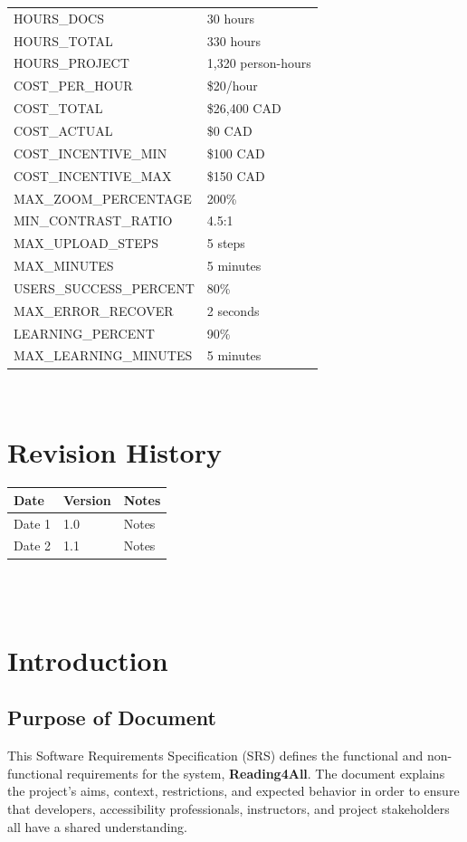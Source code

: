 \documentclass[12pt]{article}
\begin{document}
\begin{tabularx}{\textwidth}{|X|X|}
HOURS\_DOCS & 30 hours \\
HOURS\_TOTAL & 330 hours \\
HOURS\_PROJECT & 1,320 person-hours \\
COST\_PER\_HOUR & \$20/hour \\
COST\_TOTAL & \$26,400 CAD \\
COST\_ACTUAL & \$0 CAD \\
COST\_INCENTIVE\_MIN & \$100 CAD \\
COST\_INCENTIVE\_MAX & \$150 CAD \\
MAX\_ZOOM\_PERCENTAGE & 200\%\\
MIN\_CONTRAST\_RATIO & 4.5:1\\
MAX\_UPLOAD\_STEPS & 5 steps\\
MAX\_MINUTES & 5 minutes\\
USERS\_SUCCESS\_PERCENT & 80\%\\
MAX\_ERROR\_RECOVER & 2 seconds \\
LEARNING\_PERCENT & 90\% \\
MAX\_LEARNING\_MINUTES & 5 minutes \\


\bottomrule
\end{tabularx}

~\newpage

\section*{Revision History}

\begin{tabularx}{\textwidth}{p{3cm}p{2cm}X}
  \toprule {\textbf{Date}} & {\textbf{Version}} & {\textbf{Notes}}\\
  \midrule
  Date 1 & 1.0 & Notes\\
  Date 2 & 1.1 & Notes\\
  \bottomrule
\end{tabularx}

~\\

~\newpage
\section{Introduction}

\subsection{Purpose of Document}
This Software Requirements Specification (SRS) defines the functional
and non-functional requirements for the \progname{} system,
\textbf{Reading4All}. The document explains the project's aims,
context, restrictions, and expected behavior in order to ensure that
developers, accessibility professionals, instructors, and project
stakeholders all have a shared understanding.
\end{document}
